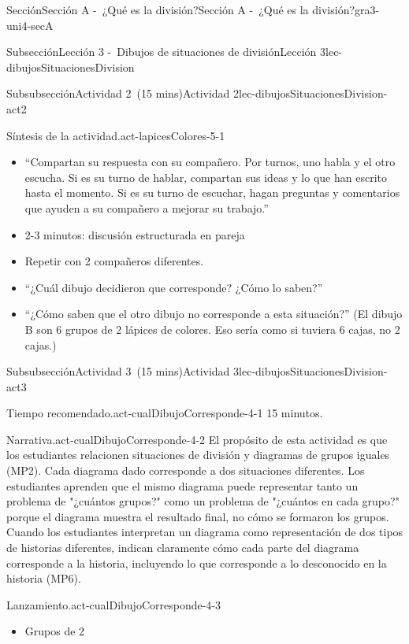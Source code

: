\documentclass[oneside,10pt,]{article}
\begin{document}
\begin{sectionptx}{Sección}{Sección A -~¿Qué es la división?}{}{Sección A -~¿Qué es la división?}{}{}{gra3-uni4-secA}
\begin{subsectionptx}{Subsección}{Lección 3 -~Dibujos de situaciones de división}{}{Lección 3}{}{}{lec-dibujosSituacionesDivision}
\begin{subsubsectionptx}{Subsubsección}{Actividad 2~(15 mins)}{}{Actividad 2}{}{}{lec-dibujosSituacionesDivision-act2}
\begin{paragraphs}{Síntesis de la actividad.}{act-lapicesColores-5-1}
\begin{itemize}[label=\textbullet]
\item{}``Compartan su respuesta con su compañero. Por turnos, uno habla y el otro escucha. Si es su turno de hablar, compartan sus ideas y lo que han escrito hasta el momento. Si es su turno de escuchar, hagan preguntas y comentarios que ayuden a su compañero a mejorar su trabajo.''%
\item{}2-3 minutos: discusión estructurada en pareja%
\item{}Repetir con 2 compañeros diferentes.%
\item{}``¿Cuál dibujo decidieron que corresponde? ¿Cómo lo saben?''%
\item{}``¿Cómo saben que el otro dibujo no corresponde a esta situación?'' (El dibujo B son 6 grupos de 2 lápices de colores. Eso sería como si tuviera 6 cajas, no 2 cajas.)%
\end{itemize}
\end{paragraphs}%
\end{subsubsectionptx}
%
%
\typeout{************************************************}
\typeout{************************************************}
%
\begin{subsubsectionptx}{Subsubsección}{Actividad 3~(15 mins)}{}{Actividad 3}{}{}{lec-dibujosSituacionesDivision-act3}
\par
\begin{paragraphs}{Tiempo recomendado.}{act-cualDibujoCorresponde-4-1}%
15 minutos.%
\end{paragraphs}%
\begin{paragraphs}{Narrativa.}{act-cualDibujoCorresponde-4-2}%
El propósito de esta actividad es que los estudiantes relacionen situaciones de división y diagramas de grupos iguales (MP2). Cada diagrama dado corresponde a dos situaciones diferentes. Los estudiantes aprenden que el mismo diagrama puede representar tanto un problema de "¿cuántos grupos?" como un problema de "¿cuántos en cada grupo?" porque el diagrama muestra el resultado final, no cómo se formaron los grupos. Cuando los estudiantes interpretan un diagrama como representación de dos tipos de historias diferentes, indican claramente cómo cada parte del diagrama corresponde a la historia, incluyendo lo que corresponde a lo desconocido en la historia (MP6).%
\end{paragraphs}%
\begin{paragraphs}{Lanzamiento.}{act-cualDibujoCorresponde-4-3}%
%
\begin{itemize}[label=\textbullet]
\item{}Grupos de 2%

\end{itemize}
\end{paragraphs}
\end{subsubsectionptx}
\end{subsectionptx}
\end{sectionptx}
\end{document}

